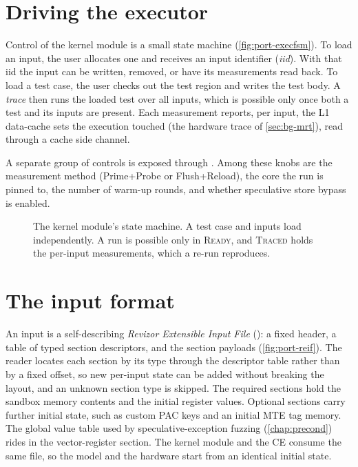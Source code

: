 \section{Driving the executor}
\label{sec:port-driving}

Control of the kernel module is a small  state machine (\autoref{fig:port-execfsm}). To
load an input, the user allocates one and receives an input identifier (\emph{iid}). With that iid
the input can be written, removed, or have its measurements read back. To load a test case, the user
checks out the test region and writes the test body. A \emph{trace} then runs the loaded test over
all inputs, which is possible only once both a test and its inputs are present. Each measurement
reports, per input, the L1 data-cache sets the execution touched (the hardware trace of
\autoref{sec:bg-mrt}), read through a cache side channel.

A separate group of controls is exposed through . Among these knobs are the measurement
method (Prime+Probe or Flush+Reload), the core the run is pinned to, the number of warm-up rounds,
and whether speculative store bypass is enabled.

\begin{figure}[t]
\centering
\fitwidth{}
\caption{The kernel module's  state machine. A test case and inputs load
independently. A run is possible only in \textsc{Ready}, and \textsc{Traced} holds the per-input measurements, which a re-run reproduces.}
\label{fig:port-execfsm}
\end{figure}

\section{The input format}
\label{sec:port-input}

An input is a self-describing \emph{Revizor Extensible Input File} (): a fixed header,
a table of typed section descriptors, and the section payloads (\autoref{fig:port-reif}). The
reader locates each section by its type through the descriptor table rather than by a fixed
offset, so new per-input state can be added without breaking the layout, and an unknown section
type is skipped. The required sections hold the sandbox memory contents and the initial register
values.
Optional sections carry further initial state, such as custom PAC keys and an initial MTE tag memory.
The global value table used by speculative-exception fuzzing (\autoref{chap:precond}) rides in the
vector-register section. The kernel module and the CE consume the same file, so the model and the
hardware start from an identical initial state.

